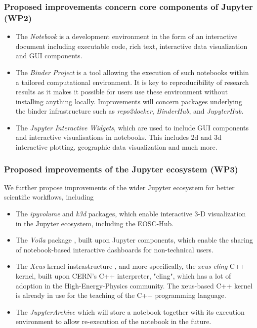 \subsubsection{Proposed improvements concern core components of Jupyter (WP2)}

\begin{itemize}
\item The \emph{Notebook} is a development environment in the form of an
interactive document including executable code, rich text, interactive data
visualization and GUI components.
\item The \emph{Binder Project} is a tool allowing the execution of such
notebooks within a tailored computational environment. It is key to reproducibility
of research results as it makes it possible for
users use these environment without installing anything locally.
Improvements will concern packages underlying the binder infrastructure such
as \emph{repo2docker}, \emph{BinderHub}, and \emph{JupyterHub}.
\item The \emph{Jupyter Interactive Widgets}, which are used to include GUI
components and interactive visualisations in notebooks. This includes 2d
and 3d interactive plotting, geographic data visualization and much more.
\end{itemize}

\subsubsection{Proposed improvements of the Jupyter ecosystem (WP3)}

We further propose improvements of the wider Jupyter ecosystem for
better scientific workflows, including
\begin{itemize}
\item The \emph{ipyvolume} and \emph{k3d} packages, which enable interactive
3-D visualization in the Jupyter ecosystem, including the EOSC-Hub.
\item The \emph{Voila} package \cite{Voila}, built upon Jupyter components, which enable the
sharing of notebook-based interactive dashboards for non-technical users.
\item The \emph{Xeus} kernel instrastructure \cite{Corlay2017}, and more specifically,
  the \emph{xeus-cling} C++ kernel, built upon CERN's C++ interpreter,
  "cling", which has a lot of adoption in the High-Energy-Physics
  community. The xeus-based C++ kernel is already in use for the
  teaching of the C++ programming language.
\item The \emph{JupyterArchive} which will store a notebook together
  with its execution environment to allow re-execution of the notebook
  in the future.
\end{itemize}

